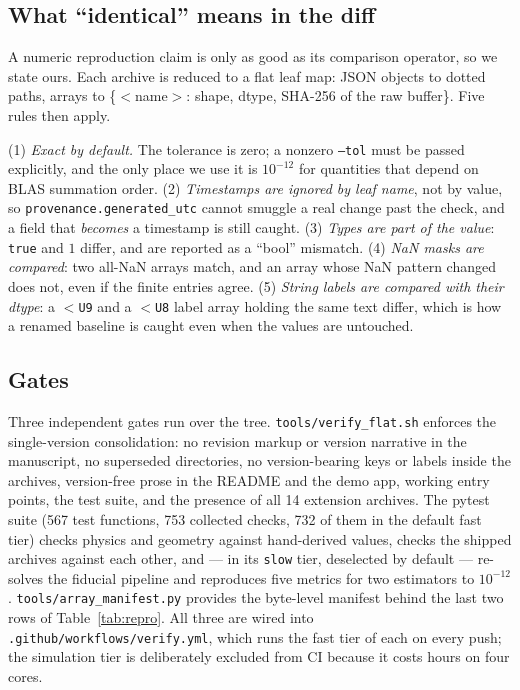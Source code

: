 \documentclass[twocolumn,10pt]{article}
\begin{document}
\subsection{What ``identical'' means in the diff}
A numeric reproduction claim is only as good as its comparison operator, so we
state ours. Each archive is reduced to a flat leaf map: JSON objects to
dotted paths, arrays to \{$<$name$>$: shape, dtype, SHA-256 of the raw
buffer\}. Five rules then apply.

(1) \emph{Exact by default.} The tolerance is zero; a nonzero
{\tt --tol} must be passed explicitly, and the only place we use it is
$10^{-12}$ for quantities that depend on BLAS summation order.
(2) \emph{Timestamps are ignored by leaf name}, not by value, so
{\tt provenance.generated\_utc} cannot smuggle a real change past the check, and
a field that \emph{becomes} a timestamp is still caught.
(3) \emph{Types are part of the value}: {\tt true} and $1$ differ, and are
reported as a \mbox{``bool''} mismatch.
(4) \emph{NaN masks are compared}: two all-NaN arrays match, and an array whose
NaN pattern changed does not, even if the finite entries agree.
(5) \emph{String labels are compared with their dtype}: a
{\tt $<$U9} and a {\tt $<$U8} label array holding the same text differ, which
is how a renamed baseline is caught even when the values are untouched.

\subsection{Gates}
Three independent gates run over the tree. {\tt tools/verify\_flat.sh} enforces
the single-version consolidation: no revision markup or
version narrative in the manuscript, no superseded directories, no
version-bearing keys or labels inside the archives, version-free prose in the
README and the demo app, working entry points, the test suite, and the presence
of all 14 extension archives. The pytest suite (567 test functions, 753 collected
checks, 732 of them in the default fast tier) checks
physics and geometry against hand-derived values, checks the shipped archives
against each other, and --- in its {\tt slow} tier, deselected by default ---
re-solves the fiducial pipeline and reproduces five metrics for two estimators
to $10^{-12}$. {\tt tools/array\_manifest.py} provides the byte-level manifest
behind the last two rows of Table~\ref{tab:repro}. All three are wired into
{\tt .github/workflows/verify.yml}, which runs the fast tier of each on every
push; the simulation tier is deliberately excluded from CI because it costs
hours on four cores.
\end{document}
